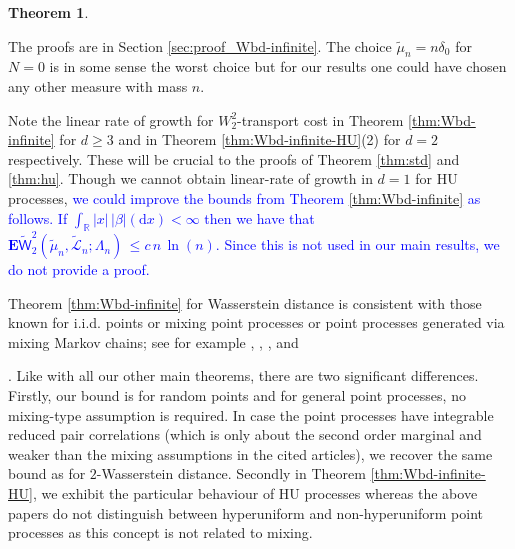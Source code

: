 \documentclass[12pt]{article}
\newtheorem{theorem}{Theorem}
\newcommand{\C}{ {\mathsf C}}
\newcommand{\R}{\mathbb{R}}
\newcommand{\tLeb}{\tilde{\mathcal{L}}}
\newcommand{\1}{\mathbf{1}}
\newcommand{\md}{\mathrm{d}}
\newcommand{\blue}[1]{\textcolor{blue}{#1}}
\newcommand{\RL}[1]{\textcolor{blue}{#1}}
\newcommand{\dy}[1]{\textcolor{blue}{#1}}
\newcommand{\RL}[1]{#1}%
\newcommand{\dy}[1]{#1}%
\begin{document}
{{{{\begin{theorem}
%
\end{theorem}
%
The proofs are in Section  \ref{sec:proof_Wbd-infinite}. The choice  $\tilde \mu_n = n\delta _{ 0}$ for $N = 0$ is in some sense the worst choice but for our results one could have chosen any other measure with mass $n$. {Note the linear rate of growth for $W_2^2$-transport cost in Theorem \ref{thm:Wbd-infinite} for $d \geq 3$ and in Theorem \ref{thm:Wbd-infinite-HU}(2) for $d=2$ respectively. These will be crucial to the proofs of Theorem \ref{thm:std} and \ref{thm:hu}. Though we cannot obtain linear-rate of growth in $d = 1$ for HU processes, \dy{we could improve the bounds from Theorem \ref{thm:Wbd-infinite} as follows. If $\int_{\R}|x| \, |\beta| (\md x) < \infty$ then we have that $\mathbf{E} { \widetilde{ \mathsf W}}_{2}^{2}(\tilde \mu _{n},\tLeb_{n};{\Lambda_n}) \,  \leqslant c \, n \, \ln(n).$ Since this is not used in our main results, we do not \RL{provide a proof.}}

{Theorem \ref{thm:Wbd-infinite} for Wasserstein distance is consistent with those known for i.i.d. points or mixing point processes or point processes generated via mixing Markov chains; see for example \cite[Section 7]{fournier2015rate}}, \cite[Section 5]{bobkov2021simple}, \cite[Section 2]{bobkov2024correction}, \cite[Theorem 2]{borda2021empirical} and \cite[Proposition B.1]{clozeau2024annealed}}. Like with all our other main theorems, there are two significant differences. Firstly, our bound is for random points and for general point processes, no mixing-type assumption is required. In case the point processes have integrable reduced pair correlations (which is only about the second order marginal and weaker than the mixing assumptions in the cited articles), we recover the same bound as \cite{bobkov2021simple,borda2021empirical,fournier2015rate} for $2$-Wasserstein distance. Secondly {in Theorem \ref{thm:Wbd-infinite-HU}}, we exhibit the particular behaviour of HU processes  whereas the above papers do not distinguish between hyperuniform and non-hyperuniform point processes as this concept is not related to mixing.

}}}}
\end{document}
